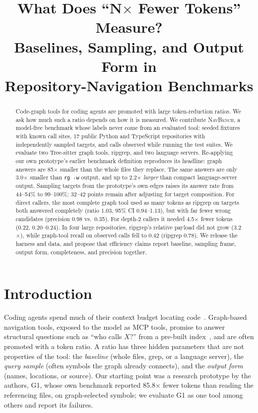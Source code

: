 \documentclass[conference]{IEEEtran}
\newcommand{\rg}{\texttt{rg\,-w}\xspace}
\begin{document}
\title{What Does ``N$\times$ Fewer Tokens'' Measure?\\Baselines, Sampling, and Output Form in\\Repository-Navigation Benchmarks}

\author{}

\maketitle

\begin{abstract}
Code-graph tools for coding agents are promoted with large token-reduction ratios.
We ask how much such a ratio depends on how it is measured.
We contribute \textsc{NavBench}, a model-free benchmark whose labels never come from an evaluated tool:
seeded fixtures with known call sites, 17 public Python and TypeScript repositories with independently sampled targets, and calls observed while running the test suites.
We evaluate two Tree-sitter graph tools, ripgrep, and two language servers.
Re-applying our own prototype's earlier benchmark definition reproduces its headline: graph answers are 85$\times$ smaller than the whole files they replace.
The same answers are only 3.0$\times$ smaller than \rg output, and up to 2.2$\times$ \emph{larger} than compact language-server output.
Sampling targets from the prototype's own edges raises its answer rate from 44--54\% to 99--100\%; 32--42 points remain after adjusting for target composition.
For direct callers, the most complete graph tool used as many tokens as ripgrep on targets both answered completely (ratio 1.03, 95\% CI 0.94--1.13), but with far fewer wrong candidates (precision 0.98 vs.\ 0.35).
For depth-2 callers it needed 4.5$\times$ fewer tokens (0.22, 0.20--0.24).
In four large repositories, ripgrep's relative payload did not grow (3.2$\times$), while graph-tool recall on observed calls fell to 0.42 (ripgrep 0.78).
We release the harness and data, and propose that efficiency claims report baseline, sampling frame, output form, completeness, and precision together.
\end{abstract}

\section{Introduction}
Coding agents spend much of their context budget locating code~\cite{bai_tokens}.
Graph-based navigation tools, exposed to the model as MCP tools, promise to answer structural questions such as ``who calls $X$?'' from a pre-built index~\cite{repograph,codexgraph,locagent,codebasememory}, and are often promoted with a token ratio.
A ratio has three hidden parameters that are not properties of the tool:
the \emph{baseline} (whole files, grep, or a language server),
the \emph{query sample} (often symbols the graph already connects),
and the \emph{output form} (names, locations, or source).
Our starting point was a research prototype by the authors, G1, whose own benchmark reported 85.8$\times$ fewer tokens than reading the referencing files, on graph-selected symbols; we evaluate G1 as one tool among others and report its failures.
\end{document}
